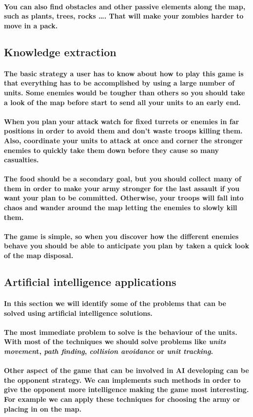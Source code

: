 \documentclass[a4paper,10pt]{article}
\newcommand{\p}[1]{\paragraph{\indent\textnormal{#1}}}
\begin{document}
  \p{You can also find obstacles and other passive elements along the map, such as plants, trees, rocks \dots. That will make your zombies harder to move in a pack.}

\newpage
  \subsection{Knowledge extraction}

    \p{The basic strategy a user has to know about how to play this game is that everything has to be accomplished by using a large number of units. Some enemies would be tougher than others so you should take a look of the map before start to send all your units to an early end.}

    \p{When you plan your attack watch for fixed turrets or enemies in far positions in order to avoid them and don't waste troops killing them. Also, coordinate your units to attack at once and corner the stronger enemies to quickly take them down before they cause so many casualties.}

    \p{The food should be a secondary goal, but you should collect many of them in order to make your army stronger for the last assault if you want your plan to be committed. Otherwise, your troops will fall into chaos and wander around the map letting the enemies to slowly kill them.}

    \p{The game is simple, so when you discover how the different enemies behave you should be able to anticipate you plan by taken a quick look of the map disposal.}

  \subsection{Artificial intelligence applications}

  \p{In this section we will identify some of the problems that can be solved using artificial intelligence solutions.}

  \p{The most immediate problem to solve is the behaviour of the units. With most of the techniques we should solve problems like \textit{units movemen}t, \textit{path finding}, \textit{collision avoidance} or \textit{unit tracking}.}

  \p{Other aspect of the game that can be involved in AI developing can be the opponent strategy. We can implements such methods in order to give the opponent more intelligence making the game most interesting. For example we can apply these techniques for choosing the army or placing in on the map.}
\end{document}
